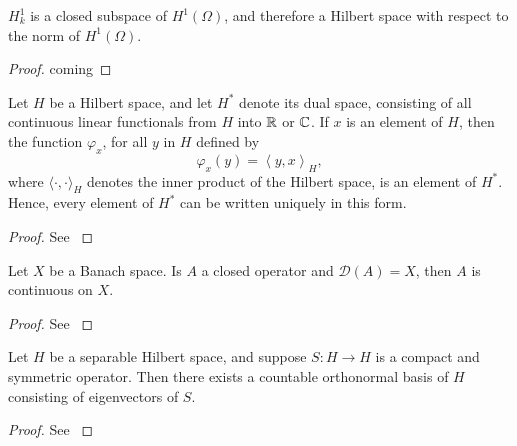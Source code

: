 \begin{atheorem}
	$H^{1}_{k}$ is a closed subspace of $H^{1}(\Omega)$, and therefore a  Hilbert space with respect to the norm of $H^{1}(\Omega)$.
	
	\begin{proof} %
		coming
	\end{proof}
\end{atheorem}

\begin{atheorem} %
	Let $H$ be a Hilbert space, and let $H^{*}$ denote its dual space, consisting of all continuous linear functionals from $H$ into $\mathbb{R}$ or $\mathbb{C}$. If $x$ is an element of $H$, then the function $\varphi_{x}$, for all $y$ in $H$ defined by
	\[ \varphi_{x}(y) = \left\langle y,x\right\rangle_{H}, \]
	where $\langle \cdot ,\cdot \rangle_{H}$ denotes the inner product of the Hilbert space, is an element of $H^{*}$. Hence, every element of $H^{*}$ can be written uniquely in this form.
	\begin{proof}
		See \cite[page 88]{weis2015funkana}
	\end{proof}
\end{atheorem}

\begin{atheorem}
	Let $X$ be a Banach space. Is $A$ a closed operator and $\mathcal{D}(A) = X$, then $A$ is continuous on $X$.
	\begin{proof}
		See \cite[page 66]{weis2015funkana}
	\end{proof}
\end{atheorem}

\begin{atheorem}
	Let $H$ be a separable Hilbert space, and suppose $S \colon H \rightarrow H$ is a compact and symmetric operator. Then there exists a countable orthonormal basis of $H$ consisting of eigenvectors of $S$.
	
	\begin{proof}
		See \cite[page 645]{evans1998partial}
	\end{proof}
\end{atheorem}

